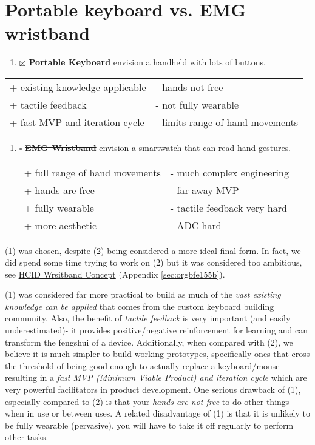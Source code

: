 \documentclass[logo,bsc,singlespacing,parskip]{infthesis}
\begin{document}
\section{Portable keyboard vs. EMG wristband}
\label{sec:org16fb948}
\begin{enumerate}
\item{$\boxtimes$} \textbf{Portable Keyboard} envision a handheld with lots of buttons.
\end{enumerate}
\begin{longtable}{|p{6.25cm}|p{6.25cm}|}
\hline
+ existing knowledge applicable & - hands not free\\
+ tactile feedback & - not fully wearable\\
+ fast MVP and iteration cycle & - limits range of hand movements\\
\hline
\end{longtable}
\begin{enumerate}
\item{$\square$} \sout{\textbf{EMG Wristband}} envision a smartwatch that can read hand gestures.
\begin{longtable}{|p{6.25cm}|p{6.25cm}|}
\hline
+ full range of hand movements & - much complex engineering\\
+ hands are free & - far away MVP\\
+ fully wearable & - tactile feedback very hard\\
+ more aesthetic & - \hyperref[org44fccbb]{ADC} hard\\
\hline
\end{longtable}
\end{enumerate}

(1) was chosen, despite (2) being considered a more ideal final form.
In fact, we did spend some time trying to work on (2) but it was considered too ambitious, see \hyperref[sec:orgbfe155b]{HCID Wrsitband Concept} (Appendix \ref{sec:orgbfe155b}).

(1) was considered far more practical to build as much of the \emph{vast existing knowledge can be applied} that comes from the custom keyboard building community.
Also, the benefit of \emph{tactile feedback} is very important (and easily underestimated)- it provides positive/negative reinforcement for learning and can transform the fengshui of a device.
Additionally, when compared with (2), we believe it is much simpler to build working prototypes, specifically ones that cross the threshold of being good enough to actually replace a keyboard/mouse resulting in a \emph{fast MVP (Minimum Viable Product) and iteration cycle} which are very powerful facilitators in product development.
One serious drawback of (1), especially compared to (2) is that your \emph{hands are not free} to do other things when in use or between uses. A related disadvantage of (1) is that it is unlikely to be fully wearable (pervasive), you will have to take it off regularly to perform other tasks.
\end{document}
